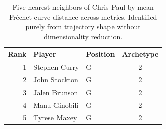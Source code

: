 \begin{table}[htbp]
  \centering\small
  \begin{tabular}{rllc}
    \toprule
    Rank & Player & Position & Archetype \\
    \midrule
    1 & Stephen Curry & G & 2 \\
    2 & John Stockton & G & 2 \\
    3 & Jalen Brunson & G & 2 \\
    4 & Manu Ginobili & G & 2 \\
    5 & Tyrese Maxey & G & 2 \\
    \bottomrule
  \end{tabular}
  \caption{Five nearest neighbors of Chris Paul by mean Fr\'{e}chet curve distance across metrics. Identified purely from trajectory shape without dimensionality reduction.}
  \label{tab:Chris_Paul_frechet_curve_neighbors}
\end{table}

